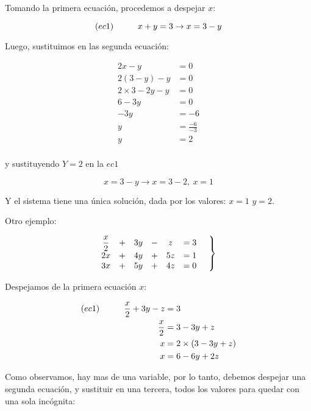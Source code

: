\documentclass[12pt]{article}
\begin{document}
    Tomando la primera ecuación, procedemos a despejar $x$:

    $$(ec1)\hspace*{1cm} x+y=3 \rightarrow x=3-y $$

    Luego, sustituimos en las segunda ecuación:

    \begin{align*}
        2x-y &= 0		\\
        2(3-y)-y &=0    \\
        2\times3 -2y-y&= 0\\
        6-3y &= 0   \\
        -3y &= -6   \\
        y &= \frac{-6}{-3} \\
        y &= 2\\
    \end{align*}

    y sustituyendo $ Y=2 $ en la $ec1$


    $$ x=3-y \rightarrow x=3-2, \ x=1 $$

    Y el sistema tiene una única solución, dada por los valores:
    $ x=1 $  $ y=2 $.


    Otro ejemplo:

    \begin{equation*}
        \left.
        \begin{matrix}
            \displaystyle\frac{x}{2} &+& 3y &-& z &= 3 \\
            2x &+& 4y &+&5z &= 1\\
            3x &+& 5y &+& 4z &=0
        \end{matrix}
        \hspace*{0.5cm}\right\rbrace
    \end{equation*}

    Despejamos de la primera ecuación $x$:

    \begin{align*}
        (ec1)\hspace*{1cm} \displaystyle\frac{x}{2} +3y-z&=3 \\
        \displaystyle\frac{x}{2} &= 3-3y+z\\
        x&= 2\times(3-3y+z)\\
        x&= 6-6y+2z
    \end{align*}

    Como observamos, hay mas de una variable, por lo tanto, debemos despejar
    una segunda ecuación, y sustituir en una tercera, todos los valores para
    quedar con una sola incógnita:
\end{document}

